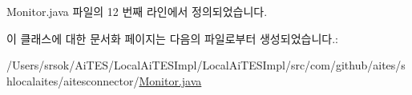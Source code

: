 Monitor.\+java 파일의 12 번째 라인에서 정의되었습니다.



이 클래스에 대한 문서화 페이지는 다음의 파일로부터 생성되었습니다.\+:\begin{DoxyCompactItemize}
\item 
/\+Users/srsok/\+Ai\+T\+E\+S/\+Local\+Ai\+T\+E\+S\+Impl/\+Local\+Ai\+T\+E\+S\+Impl/src/com/github/aites/shlocalaites/aitesconnector/\mbox{\hyperlink{_monitor_8java}{Monitor.\+java}}\end{DoxyCompactItemize}
